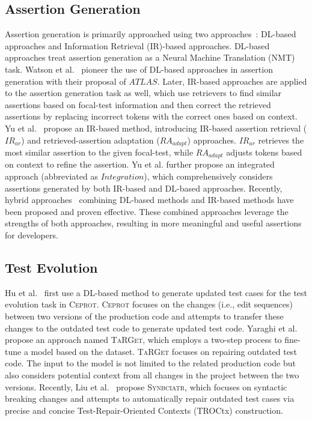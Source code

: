 \subsection{Assertion Generation}


Assertion generation is primarily approached using two approaches~\cite{he2024empirical}: DL-based approaches and Information Retrieval (IR)-based approaches.
DL-based approaches treat assertion generation as a Neural Machine Translation (NMT) task. 
Watson et al.~\cite{watson_learning_2020} pioneer the use of DL-based approaches in assertion generation with their proposal of $ATLAS$. 
Later, IR-based approaches are applied to the assertion generation task as well, which use retrievers to find similar assertions based on focal-test information and then correct the retrieved assertions by replacing incorrect tokens with the correct ones based on context.
Yu et al.~\cite{yu_automated_2022} propose an IR-based method, introducing IR-based assertion retrieval ($IR_{ar}$) and retrieved-assertion adaptation ($RA_{adapt}$) approaches. $IR_{ar}$ retrieves the most similar assertion to the given focal-test, while $RA_{adapt}$ adjusts tokens based on context to refine the assertion. Yu et al. further propose an integrated approach (abbreviated as $Integration$), which comprehensively considers assertions generated by both IR-based and DL-based approaches.
Recently, hybrid approaches~\cite{sun_revisiting_2023} combining DL-based methods and IR-based methods have been proposed and proven effective. 
These combined approaches leverage the strengths of both approaches, resulting in more meaningful and useful assertions for developers.


\subsection{Test Evolution}

Hu et al.~\cite{hu_identify_2023} first use a DL-based method to generate updated test cases for the test evolution task in \textsc{Ceprot}. \textsc{Ceprot} focuses on the changes (i.e., edit sequences) between two versions of the production code and attempts to transfer these changes to the outdated test code to generate updated test code. Yaraghi et al.~\cite{yaraghi_automated_2024} propose an approach named \textsc{TaRGet}, which employs a two-step process to fine-tune a model based on the dataset. \textsc{TaRGet} focuses on repairing outdated test code. The input to the model is not limited to the related production code but also considers potential context from all changes in the project between the two versions. Recently, Liu et al.~\cite{liu_augmenting_2024} propose \textsc{Synbciatr}, which focuses on syntactic breaking changes and attempts to automatically repair outdated test cases via precise and concise Test-Repair-Oriented Contexts (TROCtx) construction.




